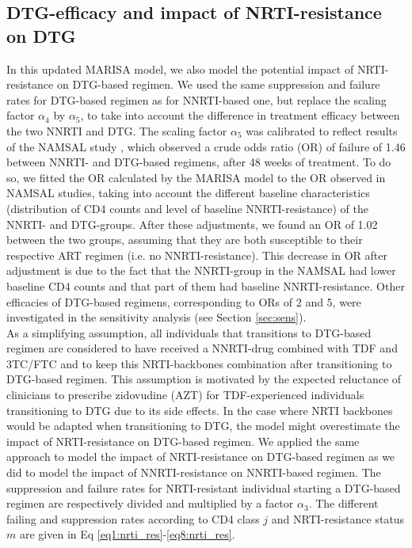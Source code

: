\documentclass{article}
\begin{document}
\subsection{DTG-efficacy and impact of NRTI-resistance on DTG}\label{sec:nrti_res}
In this updated MARISA model, we also model the potential impact of NRTI-resistance on DTG-based regimen. We used the same suppression and failure rates for DTG-based regimen as for NNRTI-based one, but replace the scaling factor $\alpha_4$ by $\alpha_5$, to take into account the difference in treatment efficacy between the two NNRTI and DTG. The scaling factor $\alpha_5$ was calibrated to reflect results of the NAMSAL study \cite{Group2019}, which observed a crude odds ratio (OR) of failure of 1.46 between NNRTI- and DTG-based regimens, after 48 weeks of treatment. To do so, we fitted the OR calculated by the MARISA model to the OR observed in NAMSAL studies, taking into account the different baseline characteristics (distribution of CD4 counts and level of baseline NNRTI-resistance) of the NNRTI- and DTG-groups. After these adjustments, we found an OR of 1.02 between the two groups, assuming that they are both susceptible to their respective ART regimen (i.e. no NNRTI-resistance). This decrease in OR after adjustment is due to the fact that the NNRTI-group in the NAMSAL had lower baseline CD4 counts and that part of them had baseline NNRTI-resistance. Other efficacies of DTG-based regimens, corresponding to ORs of 2 and 5, were investigated in the sensitivity analysis (see Section \ref{sec:sens}).\\
As a simplifying assumption, all individuals that transitions to DTG-based regimen are considered to have received a NNRTI-drug combined with TDF and 3TC/FTC and to keep this NRTI-backbones combination after transitioning to DTG-based regimen. This assumption is motivated by the expected reluctance of clinicians to prescribe zidovudine (AZT) for TDF-experienced individuals transitioning to DTG due to its side effects. In the case where NRTI backbones would be adapted when transitioning to DTG, the model might overestimate the impact of NRTI-resistance on DTG-based regimen.
We applied the same approach to model the impact of NRTI-resistance on DTG-based regimen as we did to model the impact of NNRTI-resistance on NNRTI-based regimen. The suppression and failure rates for NRTI-resistant individual starting a DTG-based regimen are respectively divided and multiplied by a factor $\alpha_3$. The different failing and suppression rates according to CD4 class $j$ and NRTI-resistance status $m$ are given in Eq \ref{eq1:nrti_res}-\ref{eq8:nrti_res}.
\end{document}

